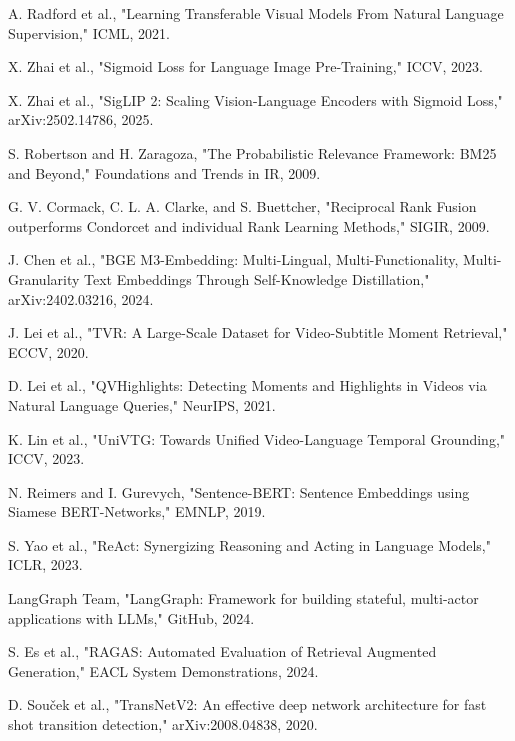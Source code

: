 \documentclass[12pt,a4paper,onecolumn]{article}
\begin{document}
\begin{enumerate}[label={[\arabic*]}]
  \item A. Radford et al., "Learning Transferable Visual Models From Natural Language Supervision," ICML, 2021.
  \item X. Zhai et al., "Sigmoid Loss for Language Image Pre-Training," ICCV, 2023.
  \item X. Zhai et al., "SigLIP 2: Scaling Vision-Language Encoders with Sigmoid Loss," arXiv:2502.14786, 2025.
  \item S. Robertson and H. Zaragoza, "The Probabilistic Relevance Framework: BM25 and Beyond," Foundations and Trends in IR, 2009.
  \item G. V. Cormack, C. L. A. Clarke, and S. Buettcher, "Reciprocal Rank Fusion outperforms Condorcet and individual Rank Learning Methods," SIGIR, 2009.
  \item J. Chen et al., "BGE M3-Embedding: Multi-Lingual, Multi-Functionality, Multi-Granularity Text Embeddings Through Self-Knowledge Distillation," arXiv:2402.03216, 2024.
  \item J. Lei et al., "TVR: A Large-Scale Dataset for Video-Subtitle Moment Retrieval," ECCV, 2020.
  \item D. Lei et al., "QVHighlights: Detecting Moments and Highlights in Videos via Natural Language Queries," NeurIPS, 2021.
  \item K. Lin et al., "UniVTG: Towards Unified Video-Language Temporal Grounding," ICCV, 2023.
  \item N. Reimers and I. Gurevych, "Sentence-BERT: Sentence Embeddings using Siamese BERT-Networks," EMNLP, 2019.
  \item S. Yao et al., "ReAct: Synergizing Reasoning and Acting in Language Models," ICLR, 2023.
  \item LangGraph Team, "LangGraph: Framework for building stateful, multi-actor applications with LLMs," GitHub, 2024.
  \item S. Es et al., "RAGAS: Automated Evaluation of Retrieval Augmented Generation," EACL System Demonstrations, 2024.
  \item D. Souček et al., "TransNetV2: An effective deep network architecture for fast shot transition detection," arXiv:2008.04838, 2020.
\end{enumerate}
\end{document}
